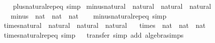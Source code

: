 \begin{isabellebody}
%
\isadelimproof
\ \ %
\endisadelimproof
%
\isatagproof
\isacommand{{\isachardot}{\kern0pt}}\isamarkupfalse%
%
\endisatagproof
{\isafoldproof}%
%
\isadelimproof
\isanewline
%
\endisadelimproof
\isanewline
{}\isamarkupfalse%
\ plus{\isacharunderscore}{\kern0pt}natural{\isachardot}{\kern0pt}rep{\isacharunderscore}{\kern0pt}eq\ {\isacharbrackleft}{\kern0pt}simp{\isacharbrackright}{\kern0pt}\isanewline
\isanewline
{}\isamarkupfalse%
\ minus{\isacharunderscore}{\kern0pt}natural\ {\isacharcolon}{\kern0pt}{\isacharcolon}{\kern0pt}\ {\isachardoublequoteopen}natural\ {\isasymRightarrow}\ natural\ {\isasymRightarrow}\ natural{\isachardoublequoteclose}\isanewline
\ \ \ {\isachardoublequoteopen}minus\ {\isacharcolon}{\kern0pt}{\isacharcolon}{\kern0pt}\ nat\ {\isasymRightarrow}\ nat\ {\isasymRightarrow}\ nat{\isachardoublequoteclose}\isanewline
%
\isadelimproof
\ \ %
\endisadelimproof
%
\isatagproof
\isacommand{{\isachardot}{\kern0pt}}\isamarkupfalse%
%
\endisatagproof
{\isafoldproof}%
%
\isadelimproof
\isanewline
%
\endisadelimproof
\isanewline
{}\isamarkupfalse%
\ minus{\isacharunderscore}{\kern0pt}natural{\isachardot}{\kern0pt}rep{\isacharunderscore}{\kern0pt}eq\ {\isacharbrackleft}{\kern0pt}simp{\isacharbrackright}{\kern0pt}\isanewline
\isanewline
{}\isamarkupfalse%
\ times{\isacharunderscore}{\kern0pt}natural\ {\isacharcolon}{\kern0pt}{\isacharcolon}{\kern0pt}\ {\isachardoublequoteopen}natural\ {\isasymRightarrow}\ natural\ {\isasymRightarrow}\ natural{\isachardoublequoteclose}\isanewline
\ \ \ {\isachardoublequoteopen}times\ {\isacharcolon}{\kern0pt}{\isacharcolon}{\kern0pt}\ nat\ {\isasymRightarrow}\ nat\ {\isasymRightarrow}\ nat{\isachardoublequoteclose}\isanewline
%
\isadelimproof
\ \ %
\endisadelimproof
%
\isatagproof
\isacommand{{\isachardot}{\kern0pt}}\isamarkupfalse%
%
\endisatagproof
{\isafoldproof}%
%
\isadelimproof
\isanewline
%
\endisadelimproof
\isanewline
{}\isamarkupfalse%
\ times{\isacharunderscore}{\kern0pt}natural{\isachardot}{\kern0pt}rep{\isacharunderscore}{\kern0pt}eq\ {\isacharbrackleft}{\kern0pt}simp{\isacharbrackright}{\kern0pt}\isanewline
\isanewline
{}\isamarkupfalse%
%
\isadelimproof
\ %
\endisadelimproof
%
\isatagproof
{}\isamarkupfalse%
\isanewline
{}\isamarkupfalse%
\ {\isacharparenleft}{\kern0pt}transfer{\isacharcomma}{\kern0pt}\ simp\ add{\isacharcolon}{\kern0pt}\ algebra{\isacharunderscore}{\kern0pt}simps{\isacharparenright}{\kern0pt}{\isacharplus}{\kern0pt}%

\end{isabellebody}

